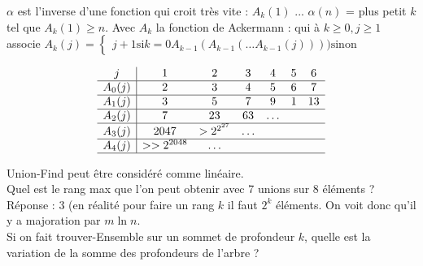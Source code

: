  $\alpha$ est l'inverse d'une fonction qui croit très vite : $A_k(1)$ ... $\alpha(n)$ = plus petit $k$ tel que $A_k(1)\geq n$. Avec $A_k$ la fonction de Ackermann : qui à $k\geq 0, j \geq 1$ associe $A_k(j) = \left\{ \begin{array}{l}
	j+1 \mathrm{si} k = 0
	A_{k-1}(A_{k-1}( \ldots A_{k-1}(j)))) \mathrm{sinon} \end{array} \right.$

$$
\begin{array}{c|cccccc}
	j & 1 & 2 & 3 & 4 & 5 & 6 \\ \hline
A_0(j) & 2 & 3 & 4 & 5 & 6 & 7  \\ \hline
A_1(j) & 3 & 5 & 7 & 9 & 1 & 13  \\ \hline
A_2(j) & 7 & 23 & 63 & \ldots \\ \hline
A_3(j) & 2047 & >2^{2^{27}} & \ldots \\ \hline
A_4(j) & >> 2^{2048} & \ldots \\ \hline
\end{array}
$$

 Union-Find peut être considéré comme linéaire.\\

 Quel est le rang max que l'on peut obtenir avec 7 unions sur 8 éléments ? Réponse : 3 (en réalité pour faire un rang $k$ il faut $2^k$ éléments. On voit donc qu'il y a majoration par $m\ln n$. \\

 Si on fait trouver-Ensemble sur un sommet de profondeur $k$, quelle est la variation de la somme des profondeurs de l'arbre ? \\

